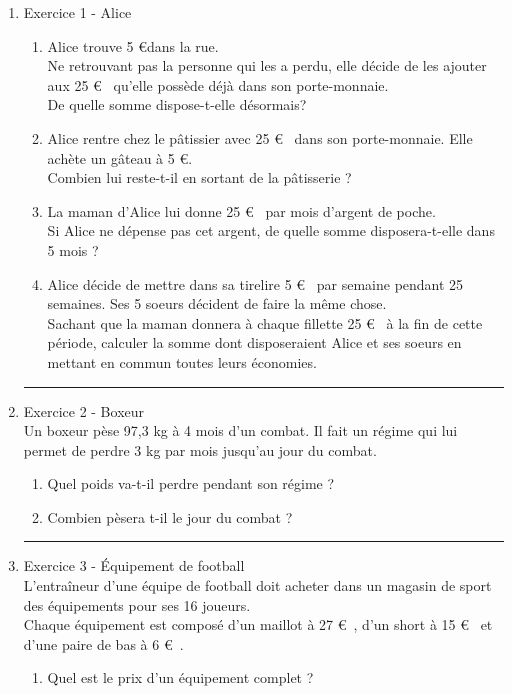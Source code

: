 \documentclass[11pt]{article}
\begin{document}
\begin{multicols}{2}
\begin{enumerate}
\item[1] Exercice 1 - Alice
  \begin{enumerate}
  \item Alice trouve 5 \euro dans la rue.\\
    Ne retrouvant pas la personne qui les a perdu, elle décide de les ajouter aux 25 \euro~ qu’elle possède déjà dans son porte-monnaie.\\
    De quelle somme dispose-t-elle désormais?
  \item Alice rentre chez le pâtissier avec 25 \euro~ dans son porte-monnaie. Elle achète un gâteau à 5 \euro.\\
    Combien lui reste-t-il en sortant de la pâtisserie ?
  \item La maman d’Alice lui donne 25 \euro~ par mois d’argent de poche. \\
    Si Alice ne dépense pas cet argent, de quelle somme disposera-t-elle dans 5 mois ?
  \item Alice décide de mettre dans sa tirelire 5 \euro~ par semaine pendant 25 semaines. Ses 5 soeurs décident de faire la même chose. \\
    Sachant que la maman donnera à chaque fillette 25 \euro~ à la fin de cette période, calculer la somme dont disposeraient Alice et ses soeurs en mettant en commun toutes leurs économies.
  \end{enumerate}
  \rule{\linewidth}{0.5pt}
\item[2] Exercice 2 - Boxeur\\
  Un boxeur pèse 97,3 kg à 4 mois d’un combat. Il fait un régime qui lui permet de perdre 3 kg par mois jusqu’au jour du combat.
  \begin{enumerate}
  \item Quel poids va-t-il perdre pendant son régime ?
  \item Combien pèsera t-il le jour du combat ?
  \end{enumerate}
\rule{\linewidth}{0.5pt}
\item[3] Exercice 3 - Équipement de football \\
  L’entraîneur d’une équipe de football doit acheter dans un magasin de sport des équipements pour ses 16 joueurs.\\
  Chaque équipement est composé d’un maillot à 27 \euro~, d’un short à 15 \euro~ et d’une paire de bas à 6 \euro~.\\
  \begin{enumerate}
  \item Quel est le prix d’un équipement complet ?

\end{enumerate}
\end{enumerate}
\end{multicols}
\end{document}
